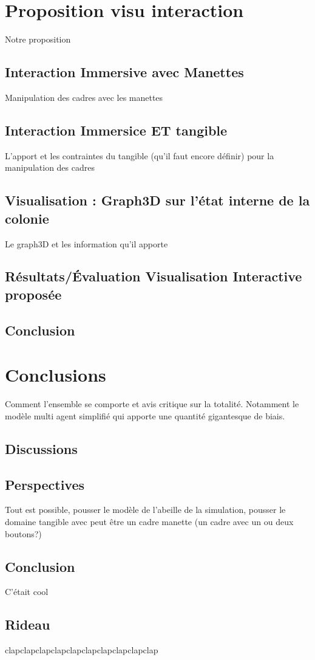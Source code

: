 \documentclass[11pt,a4paper]{report}
\begin{document}
		
		
		
\chapter{Proposition visu interaction}
	Notre proposition
	\section{Interaction Immersive avec Manettes}
		Manipulation des cadres avec les manettes
	\section{Interaction Immersice ET tangible}
		L'apport et les contraintes du tangible (qu'il faut encore définir) pour la manipulation des cadres
	\section{Visualisation : Graph3D sur l'état interne de la colonie}
		Le graph3D et les information qu'il apporte
	\section{Résultats/Évaluation Visualisation Interactive proposée}
	
			
	\section*{Conclusion}
	
	
	
	
\chapter{Conclusions}
	Comment l'ensemble se comporte et avis critique sur la totalité. Notamment le modèle multi agent simplifié qui apporte une quantité gigantesque de biais.
\section{Discussions}
	
\section{Perspectives}
	Tout est possible, pousser le modèle de l'abeille de la simulation, pousser le domaine tangible avec peut être un cadre manette (un cadre avec un ou deux boutons?)
\section{Conclusion}
	C'était cool
\section*{Rideau}
	clapclapclapclapclapclapclapclapclapclap
\end{document}
